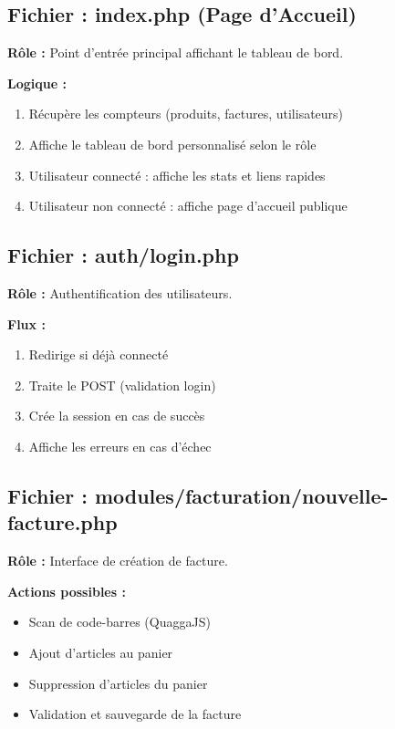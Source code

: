 \documentclass[12pt,a4paper]{report}
\begin{document}
\subsection{Fichier : index.php (Page d'Accueil)}

\textbf{Rôle :} Point d'entrée principal affichant le tableau de bord.

\textbf{Logique :}
\begin{enumerate}
    \item Récupère les compteurs (produits, factures, utilisateurs)
    \item Affiche le tableau de bord personnalisé selon le rôle
    \item Utilisateur connecté : affiche les stats et liens rapides
    \item Utilisateur non connecté : affiche page d'accueil publique
\end{enumerate}

\subsection{Fichier : auth/login.php}

\textbf{Rôle :} Authentification des utilisateurs.

\textbf{Flux :}
\begin{enumerate}
    \item Redirige si déjà connecté
    \item Traite le POST (validation login)
    \item Crée la session en cas de succès
    \item Affiche les erreurs en cas d'échec
\end{enumerate}

\subsection{Fichier : modules/facturation/nouvelle-facture.php}

\textbf{Rôle :} Interface de création de facture.

\textbf{Actions possibles :}
\begin{itemize}
    \item Scan de code-barres (QuaggaJS)
    \item Ajout d'articles au panier
    \item Suppression d'articles du panier
    \item Validation et sauvegarde de la facture
\end{itemize}
\end{document}
